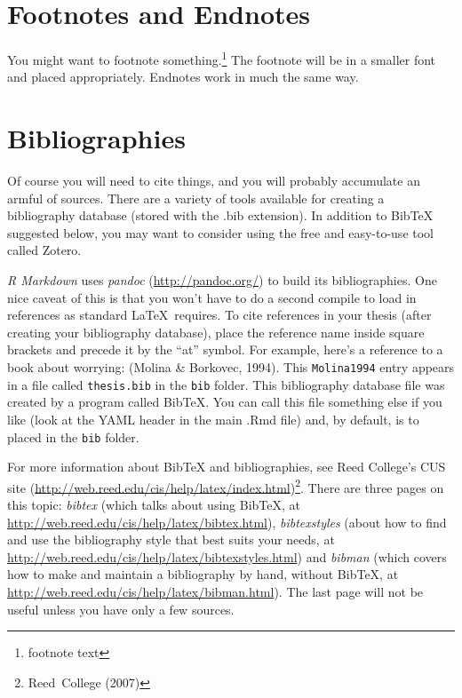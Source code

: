 \documentclass[12pt,twoside]{amherstthesis}
\begin{document}
  \section{Footnotes and Endnotes}\label{footnotes-and-endnotes}
  
  You might want to footnote something.\footnote{footnote text} The
  footnote will be in a smaller font and placed appropriately. Endnotes
  work in much the same way.
  
  \section{Bibliographies}\label{bibliographies}
  
  Of course you will need to cite things, and you will probably accumulate
  an armful of sources. There are a variety of tools available for
  creating a bibliography database (stored with the .bib extension). In
  addition to BibTeX suggested below, you may want to consider using the
  free and easy-to-use tool called Zotero.
  
  \emph{R Markdown} uses \emph{pandoc} (\url{http://pandoc.org/}) to build
  its bibliographies. One nice caveat of this is that you won't have to do
  a second compile to load in references as standard \LaTeX~requires. To
  cite references in your thesis (after creating your bibliography
  database), place the reference name inside square brackets and precede
  it by the ``at'' symbol. For example, here's a reference to a book about
  worrying: (Molina \& Borkovec, 1994). This \texttt{Molina1994} entry
  appears in a file called \texttt{thesis.bib} in the \texttt{bib} folder.
  This bibliography database file was created by a program called BibTeX.
  You can call this file something else if you like (look at the YAML
  header in the main .Rmd file) and, by default, is to placed in the
  \texttt{bib} folder.
  
  For more information about BibTeX and bibliographies, see Reed College's
  CUS site (\url{http://web.reed.edu/cis/help/latex/index.html})\footnote{Reed~College
    (2007)}. There are three pages on this topic: \emph{bibtex} (which
  talks about using BibTeX, at
  \url{http://web.reed.edu/cis/help/latex/bibtex.html}),
  \emph{bibtexstyles} (about how to find and use the bibliography style
  that best suits your needs, at
  \url{http://web.reed.edu/cis/help/latex/bibtexstyles.html}) and
  \emph{bibman} (which covers how to make and maintain a bibliography by
  hand, without BibTeX, at
  \url{http://web.reed.edu/cis/help/latex/bibman.html}). The last page
  will not be useful unless you have only a few sources.
  
\end{document}
